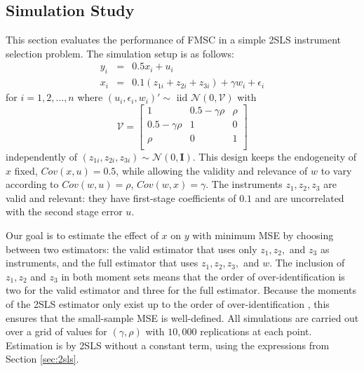 \documentclass[12pt]{article}
\theoremstyle{definition}
\begin{document}
\subsection{Simulation Study}\label{sec:fmscsim}
This section evaluates the performance of FMSC in a simple 2SLS instrument selection problem. The simulation setup is as follows:
\begin{eqnarray}
		\label{eq:secondstage}
		y_i &=& 0.5 x_i + u_i\\ 
		x_i &=& 0.1 (z_{1i} + z_{2i} + z_{3i}) + \gamma w_i + \epsilon_i 
		\label{eq:firststage}
	\end{eqnarray}
for $i=1, 2, \hdots, n$ where $(u_i, \epsilon_i, w_i)' \sim \mbox{ iid  } \mathcal{N}(0,\mathcal{V})$ with	
\begin{equation}
			\label{eq:varmatrix}
			\mathcal{V} = \left[  
				\begin{array}{cccc}
					1 & 0.5 - \gamma\rho & \rho\\
					0.5 - \gamma \rho & 1 & 0\\
					\rho & 0 & 1 \\
				\end{array}
		\right]
\end{equation}	
independently of $(z_{1i}, z_{2i}, z_{3i})\sim \mathcal{N}(0, \mathbf{I})$. This design keeps the endogeneity of $x$ fixed, $Cov(x,u) = 0.5$, while allowing the validity and relevance of $w$ to vary according to $Cov(w,u) =\rho$, $Cov(w,x) = \gamma$. The instruments $z_1, z_2, z_3$ are valid and relevant: they have first-stage coefficients of $0.1$ and are uncorrelated with the second stage error $u$. 

Our goal is to estimate the effect of $x$ on $y$ with minimum MSE by choosing between two estimators: the valid estimator that uses only $z_1, z_2,$ and $z_3$ as instruments, and the full estimator that uses $z_1, z_2, z_3,$ and $w$. The inclusion of $z_1, z_2$ and $z_3$ in both moment sets means that the order of over-identification is two for the valid estimator and three for the full estimator. Because the moments of the 2SLS estimator only exist up to the order of over-identification \citep{Phillips1980}, this ensures that the small-sample MSE is well-defined. All simulations are carried out over a grid of values for $(\gamma, \rho)$ with $10,000$ replications at each point. Estimation is by 2SLS without a constant term, using the expressions from Section \ref{sec:2sls}.
\end{document}
